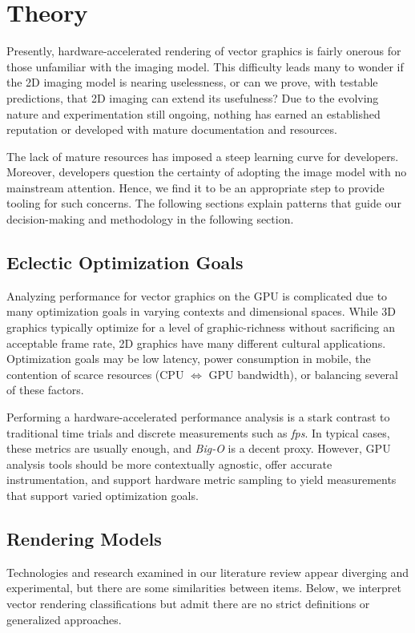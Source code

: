 \section{Theory}\label{sec:theory}
Presently, hardware-accelerated rendering of vector graphics is fairly onerous for those unfamiliar with the imaging model. This difficulty leads many to wonder if the 2D imaging model is nearing uselessness, or can we prove, with testable predictions, that 2D imaging can extend its usefulness? Due to the evolving nature and experimentation still ongoing, nothing has earned an established reputation or developed with mature documentation and resources.\medskip

The lack of mature resources has imposed a steep learning curve for developers. Moreover, developers question the certainty of adopting the image model with no mainstream attention. Hence, we find it to be an appropriate step to provide tooling for such concerns. The following sections explain patterns that guide our decision-making and methodology in the following section.

\subsection{Eclectic Optimization Goals}\label{sec:optimization_goals}
Analyzing performance for vector graphics on the GPU is complicated due to many optimization goals in varying contexts and dimensional spaces. While 3D graphics typically optimize for a level of graphic-richness without sacrificing an acceptable frame rate, 2D graphics have many different cultural applications. Optimization goals may be low latency, power consumption in mobile, the contention of scarce resources (CPU $\Leftrightarrow$ GPU bandwidth), or balancing several of these factors.\medskip

Performing a hardware-accelerated performance analysis is a stark contrast to traditional time trials and discrete measurements such as \textit{fps}. In typical cases, these metrics are usually enough, and \emph{Big-O} is a decent proxy. However, GPU analysis tools should be more contextually agnostic, offer accurate instrumentation, and support hardware metric sampling to yield measurements that support varied optimization goals.

\subsection{Rendering Models}
Technologies and research examined in our literature review appear diverging and experimental, but there are some similarities between items. Below, we interpret vector rendering classifications but admit there are no strict definitions or generalized approaches.


